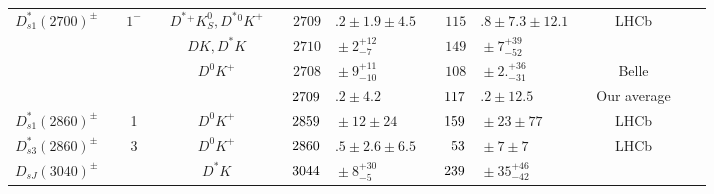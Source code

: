 \begin{adjustbox}{width=\textwidth,center}
{\begin{tabular}{cp{5pt}cp{5pt}cp{5pt}r@{}lp{5pt}r@{}lp{5pt}cp{5pt}c}
	\multirow{4}{*}{$D_{s1}^{*}(2700)^{\pm}$}	&&	\multirow{4}{*}{$1^{-}$}	&&	$D^{*}{}^{+}K_{S}^{0}, D^{*}{}^{0}K^{+}$	&&$	2709$&$.2\pm1.9\pm4.5	$&&$	115$&$.8\pm7.3\pm12.1	$&&	LHCb	&&	\cite{Aaij:2012pc}            \\
		&&		&&	$DK, D^{*}K$	&&$	2710$&${}\pm 2 _{-7}^{+12}	$&&$	149$&${}\pm7 _{-52}^{+39}	$&&	\babar{}	&&	\cite{Aubert:2009ah}          \\
		&&		&&	$D^{0}K^{+}$	&&$	2708$&${}\pm9 _{-10}^{+11}	$&&$	108$&${}\pm2. _{-31}^{+36}	$&&	Belle	&&	\cite{Brodzicka:2007aa}       \\ \cmidrule{6-14}
		&&		&&		&\cellcolor{Gray}&$	\cellcolor{Gray} 2709$&\cellcolor{Gray}$.2 \pm 4.2	$&\cellcolor{Gray}&$	\cellcolor{Gray} 117$&\cellcolor{Gray}$.2 \pm 12.5	$&\cellcolor{Gray}&	\cellcolor{Gray} Our average	&\cellcolor{Gray}&	\\ \midrule
	\multirow{1}{*}{$D_{s1}^{*}(2860)^{\pm}$}	&&	\multirow{1}{*}{1}	&&	$ D^{0}K^{+}$	&\cellcolor{LightGray} &$	\cellcolor{LightGray} 2859$&\cellcolor{LightGray}${}\pm12\pm24	$&\cellcolor{LightGray}&$	\cellcolor{LightGray} 159$&\cellcolor{LightGray}${}\pm23\pm77	$&\cellcolor{LightGray}&	\cellcolor{LightGray} LHCb	&\cellcolor{LightGray}&	\cite{Aaij:2014xza}           \\ \midrule
	\multirow{1}{*}{$D_{s3}^{*}(2860)^{\pm}$}	&&	\multirow{1}{*}{3}	&&	$ D^{0}K^{+}$	&\cellcolor{LightGray}&$	\cellcolor{LightGray} 2860$&\cellcolor{LightGray}$.5\pm2.6\pm6.5	$&\cellcolor{LightGray}&$	\cellcolor{LightGray} 53$&\cellcolor{LightGray}${}\pm7\pm7	$&\cellcolor{LightGray}&	\cellcolor{LightGray} LHCb	&\cellcolor{LightGray}&	\cite{Aaij:2014xza}           \\ \midrule
	\multirow{1}{*}{$D_{sJ}(3040)^{\pm}$}	&&	\multirow{1}{*}{}	&&	$D^{*}K$	&\cellcolor{LightGray}&$	\cellcolor{LightGray} 3044$&\cellcolor{LightGray}${}\pm8 _{-5}^{+30}	$&\cellcolor{LightGray}&$	\cellcolor{LightGray}239$&\cellcolor{LightGray}${}\pm35 _{-42}^{+46}	$&\cellcolor{LightGray}&	\cellcolor{LightGray} \babar{}	&\cellcolor{LightGray}&	\cite{Aubert:2009ah}          \\ \bottomrule
\end{tabular}
}
\end{adjustbox}
